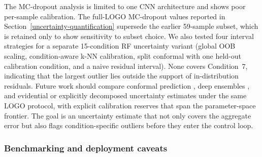 The MC-dropout analysis is limited to one CNN architecture and shows poor
per-sample calibration. The full-LOGO MC-dropout values reported in
Section~\ref{uncertainty-quantification} supersede the earlier 59-sample
subset, which is retained only to show sensitivity to subset choice. We
also tested four interval strategies for a separate 15-condition RF uncertainty variant (global OOB scaling, condition-aware k-NN calibration,
split conformal with one held-out calibration condition, and a naive
residual interval). None covers Condition~7, indicating that the largest
outlier lies outside the support of in-distribution residuals. Future
work should compare conformal prediction
\cite{Angelopoulos2023, zhang2023improved}, deep ensembles
\cite{lakshminarayanan2017simple}, and evidential or explicitly decomposed
uncertainty estimates under the same LOGO protocol, with explicit
calibration reserves that span the parameter-space frontier. The goal is
an uncertainty estimate that not only covers the aggregate error but also
flags condition-specific outliers before they enter the control loop.

\subsubsection{Benchmarking and deployment caveats}

